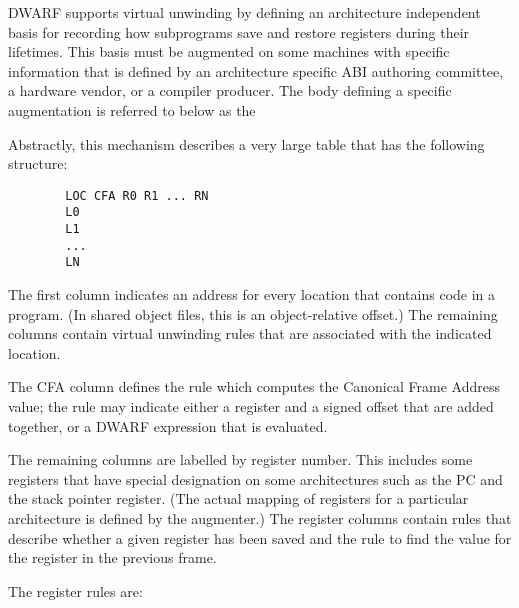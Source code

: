 DWARF supports virtual unwinding by defining an architecture
independent basis for recording how subprograms save and restore
registers during their lifetimes. This basis must be augmented
on some machines with specific information that is defined by
an architecture specific ABI authoring committee, a hardware
vendor, or a compiler producer. The body defining a specific
augmentation is referred to below as the 

Abstractly, this mechanism describes a very large table that
has the following structure:

\begin{verbatim}
        LOC CFA R0 R1 ... RN
        L0
        L1
        ...
        LN
\end{verbatim}


The first column indicates an address for every location
that contains code in a program. (In shared object files, this
is an object-relative offset.) The remaining columns contain
virtual unwinding rules that are associated with the indicated
location.

The CFA column defines the rule which computes the Canonical
Frame Address value; 
\bb
the rule may indicate
\eb
either a register and a signed
offset that are added together, or a DWARF expression that
is evaluated.

The remaining columns are labelled by register number. This
includes some registers that have special designation on
some architectures such as the PC and the stack pointer
register. (The actual mapping of registers for a particular
architecture is defined by the augmenter.) The register columns
contain rules that describe whether a given register has been
saved and the rule to find the value for the register in the
previous frame.

The register rules are:

